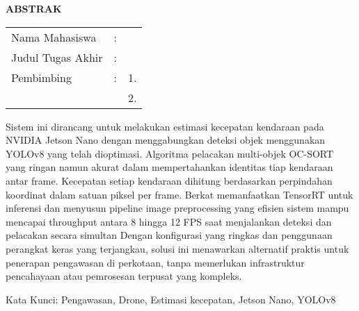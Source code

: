 \begin{center}
  \large\textbf{ABSTRAK}
\end{center}


\vspace{2ex}

\begingroup
\setlength{\tabcolsep}{0pt}

\noindent
\begin{tabularx}{\textwidth}{l >{\centering}m{2em} X}
  Nama Mahasiswa    & : & \name{}         \\

  Judul Tugas Akhir & : & \tatitle{}      \\

  Pembimbing        & : & 1. \advisor{}   \\
                    &   & 2. \coadvisor{} \\
\end{tabularx} 
\endgroup

Sistem ini dirancang untuk melakukan estimasi kecepatan kendaraan pada NVIDIA Jetson Nano dengan menggabungkan deteksi objek menggunakan YOLOv8 yang telah dioptimasi. Algoritma pelacakan multi-objek OC-SORT yang ringan namun akurat dalam mempertahankan identitas tiap kendaraan antar frame. Kecepatan setiap kendaraan dihitung berdasarkan perpindahan koordinat dalam satuan piksel per frame. Berkat memanfaatkan TensorRT untuk inferensi dan menyusun pipeline image preprocessing yang efisien sistem mampu mencapai throughput antara 8 hingga 12 FPS saat menjalankan deteksi dan pelacakan secara simultan Dengan konfigurasi yang ringkas dan penggunaan perangkat keras yang terjangkau, solusi ini menawarkan alternatif praktis untuk penerapan pengawasan di perkotaan, tanpa memerlukan infrastruktur pencahayaan atau pemrosesan terpusat yang kompleks.


Kata Kunci: Pengawasan, Drone, Estimasi kecepatan, Jetson Nano, YOLOv8

